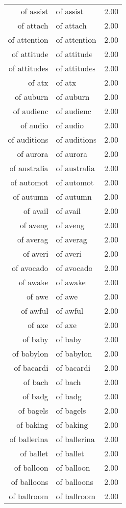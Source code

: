 \begin{table}[ht]
\begin{tabular}{rlr}
  of assist & of assist & 2.00 \\ 
  of attach & of attach & 2.00 \\ 
  of attention & of attention & 2.00 \\ 
  of attitude & of attitude & 2.00 \\ 
  of attitudes & of attitudes & 2.00 \\ 
  of atx & of atx & 2.00 \\ 
  of auburn & of auburn & 2.00 \\ 
  of audienc & of audienc & 2.00 \\ 
  of audio & of audio & 2.00 \\ 
  of auditions & of auditions & 2.00 \\ 
  of aurora & of aurora & 2.00 \\ 
  of australia & of australia & 2.00 \\ 
  of automot & of automot & 2.00 \\ 
  of autumn & of autumn & 2.00 \\ 
  of avail & of avail & 2.00 \\ 
  of aveng & of aveng & 2.00 \\ 
  of averag & of averag & 2.00 \\ 
  of averi & of averi & 2.00 \\ 
  of avocado & of avocado & 2.00 \\ 
  of awake & of awake & 2.00 \\ 
  of awe & of awe & 2.00 \\ 
  of awful & of awful & 2.00 \\ 
  of axe & of axe & 2.00 \\ 
  of baby & of baby & 2.00 \\ 
  of babylon & of babylon & 2.00 \\ 
  of bacardi & of bacardi & 2.00 \\ 
  of bach & of bach & 2.00 \\ 
  of badg & of badg & 2.00 \\ 
  of bagels & of bagels & 2.00 \\ 
  of baking & of baking & 2.00 \\ 
  of ballerina & of ballerina & 2.00 \\ 
  of ballet & of ballet & 2.00 \\ 
  of balloon & of balloon & 2.00 \\ 
  of balloons & of balloons & 2.00 \\ 
  of ballroom & of ballroom & 2.00 \\ 

\end{tabular}
\end{table}
